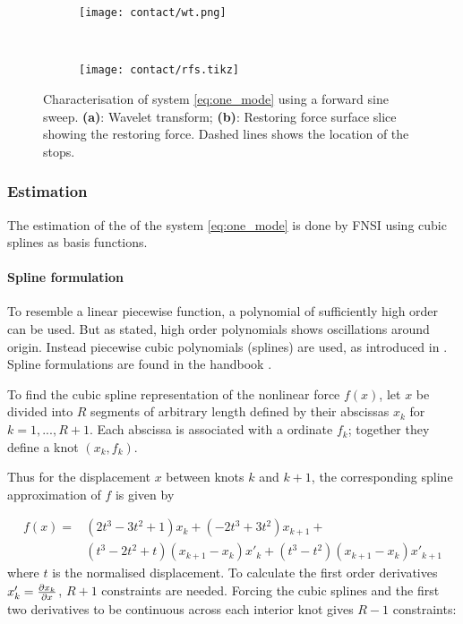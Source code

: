 \begin{figure}
  \centering
  \begin{subfigure}[b]{0.45\textwidth}
    \texttt{[image: contact/wt.png]}
    \caption{}
  \end{subfigure}
  ~
  \begin{subfigure}[b]{0.45\textwidth}
    \texttt{[image: contact/rfs.tikz]}
    \caption{}
  \end{subfigure}
  \caption{Characterisation of system \eqref{eq:one_mode} using a forward sine sweep.
    \textbf{(a)}: Wavelet transform;
    \textbf{(b)}: Restoring force surface slice showing the restoring force.
    Dashed lines shows the location of the stops.}
  \label{fig:contact_characterisation}
\end{figure}



\subsubsection{Estimation}

The estimation of the of the system \eqref{eq:one_mode} is done by FNSI using
cubic splines as basis functions.

\paragraph{Spline formulation}

To resemble a linear piecewise function, a polynomial of sufficiently high order
can be used. But as stated, high order polynomials shows oscillations around
origin. Instead piecewise cubic polynomials (splines) are used, as introduced in
\autocite{noel2014b}. Spline formulations are found in the handbook
\autocite{boor2001a}.

To find the cubic spline representation of the nonlinear force $f(x)$, let $x$
be divided into $R$ segments of arbitrary length defined by their abscissas
$x_k$ for $k=1,...,R+1$. Each abscissa is associated with a ordinate $f_k$;
together they define a knot $(x_k, f_k)$.

Thus for the displacement $x$ between knots $k$ and $k+1$, the corresponding
spline approximation of $f$ is given by

\begin{equation}
  \label{eq:spline_interp}
  \begin{aligned}
    f(x) =& (2t^3-3t^2+1)x_k + (-2t^3+3t^2)x_{k+1} + \\
    &(t^3-2t^2+t)(x_{k+1}-x_k)x'_k + (t^3-t^2)(x_{k+1}-x_k)x'_{k+1}
  \end{aligned}
\end{equation}
where $t$ is the normalised displacement. To calculate the first order
derivatives $x'_k = \frac{\partial x_k}{\partial x}$, $R+1$ constraints are needed.
Forcing the cubic splines and the first two derivatives to be continuous across
each interior knot gives $R-1$ constraints:

